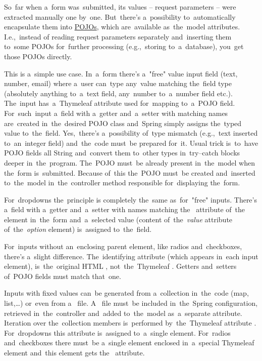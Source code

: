 So~far when a~form was~submitted, its values -- request parameters -- were extracted manually one by~one.
But~there's a~possibility to~automatically encapsulate them into \hyperref[pojo]{POJOs}, which are~available as~the~model attributes.
I.e.,~instead of reading request parameters separately and~inserting them to~some POJOs for~further processing (e.g.,~storing to~a~database), you~get those POJOs directly.

This is a~simple use case.
In~a~form there's a~"free" value input field (text, number, email) where a~user can~type any~value matching the~field type (absolutely anything to~a~text field, any~number to~a~number field etc.).
The~input has~a~Thymeleaf attribute  used for~mapping to~a~POJO field.
For~such~input a~field with a~getter and~a~setter with matching names are~created in~the~desired POJO class and~Spring simply assigns the~typed value to~the~field.
Yes,~there's a~possibility of~type mismatch (e.g.,~text inserted to~an~integer field) and~the~code must~be prepared for~it.
Usual trick is~to~have POJO fields all String and~convert them to~other types in~try--catch blocks deeper in~the~program.
The~POJO must~be already present in~the~model when the~form is~submitted.
Because of~this the~POJO must~be created and~inserted to~the~model in~the~controller method responsible for~displaying the~form.

For~dropdowns the~principle is completely the~same as~for~"free" inputs.
There's a~field with a~getter and~a~setter with names matching the~ attribute of~the~ element in~the~form and~a~selected value (content of~the~\textit{value} attribute of~the~\textit{option} element) is~assigned to~the~field.

For~inputs without an~enclosing parent element, like radios and~checkboxes, there's a~slight difference.
The~identifying attribute (which appears in~each input element), is~the~original HTML , not~the~Thymeleaf .
Getters and~setters of~POJO fields must match that~one.

Inputs with fixed values can~be generated from a~collection in~the~code (map, list,\dots) or~even from a~\hyperref[properties]{} file.
A~ file must~be included in~the~Spring configuration, retrieved in~the~controller and~added to~the~model as~a~separate attribute.
Iteration over the~collection members is~performed by~the~Thymeleaf attribute .
For~dropdowns this attribute is~assigned to~a~single  element.
For~radios and~checkboxes there must~be a~single  element enclosed in~a~special Thymeleaf element  and~this element gets the~ attribute.


